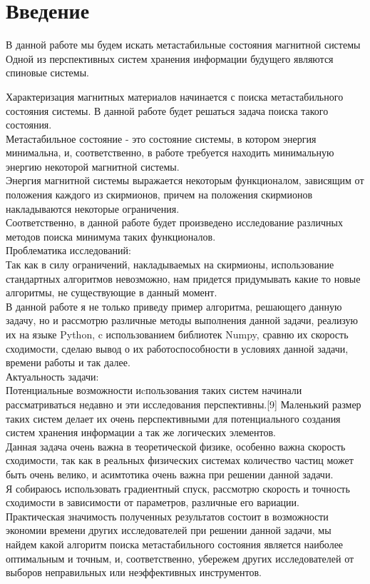 \documentclass[ 12pt,x11names]{article}
\begin{document}
    \tableofcontents %
    \clearpage
    \section{Введение}    \noindent
    В данной работе мы будем искать метастабильные состояния магнитной системы\\
    Одной из перспективных систем хранения информации будущего являются спиновые системы.

    Характеризация магнитных материалов начинается с  поиска метастабильного состояния системы.
    В данной работе будет решаться задача поиска такого состояния.\\
        Метастабильное состояние - это состояние системы, в котором энергия минимальна, и, соответственно, в работе требуется находить минимальную энергию некоторой магнитной системы.\\
    Энергия магнитной системы выражается некоторым функционалом, зависящим от положения каждого из скирмионов, причем на положения скирмионов накладываются некоторые ограничения. \\Соответственно, в данной работе будет произведено исследование различных методов поиска минимума таких функционалов.\\
    Проблематика исследований:\\
     Так как в силу ограничений, накладываемых на скирмионы, использование стандартных алгоритмов невозможно, нам придется придумывать какие то новые алгоритмы, не существующие в данный момент.\\
    В данной работе я не только приведу пример алгоритма, решающего данную задачу, но и   рассмотрю различные методы выполнения данной задачи, реализую их на языке Python, c использованием библиотек Numpy, сравню их скорость сходимости, сделаю вывод о их работоспособности в условиях данной задачи, времени работы и так далее.\\
    Актуальность задачи:\\
     Потенциальные возможности иcпользования таких систем начинали рассматриваться недавно и эти исследования перспективны.[9]
     Маленький размер таких систем делает их очень перспективными для потенциального создания систем хранения информации а так же логических элементов.\\
    Данная задача очень важна в теоретической физике, особенно важна скорость сходимости, так как в реальных физических системах количество частиц может быть очень велико, и асимтотика очень важна при решении данной задачи.\\
    Я собираюсь использовать градиентный спуск, рассмотрю скорость и точность сходимости в зависимости от параметров, различные его вариации.\\
     Практическая значимость полученных результатов состоит в возможности экономии времени других исследователей при решении данной задачи, мы найдем какой алгоритм поиска метастабильного состояния является наиболее оптимальным и точным, и, соответственно, убережем других исследователей от выборов неправильных или неэффективных инструментов.\\
\end{document}
